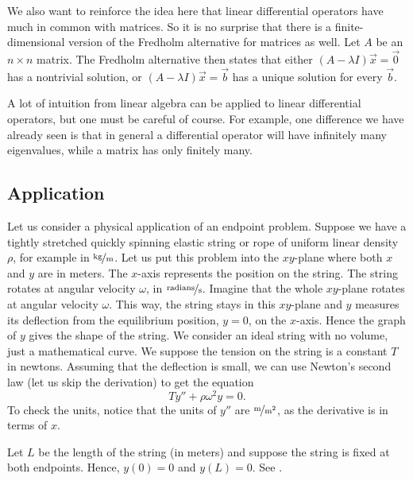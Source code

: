 We also want to reinforce the idea here that linear differential operators have
much in common with matrices.  So it is no surprise that
there is a finite-dimensional version of the Fredholm alternative for matrices as
well.  Let $A$ be an $n \times n$ matrix.  The Fredholm alternative then
states that either $(A-\lambda I) \vec{x}
= \vec{0}$ has a nontrivial solution, or $(A-\lambda I) \vec{x} = \vec{b}$
has a unique solution for every $\vec{b}$.

A lot of intuition from linear algebra can be applied to linear differential
operators, but one must be careful of course.  For example, one 
difference we have already seen is that in general a differential operator
will have infinitely many eigenvalues, while a matrix has only finitely many.

\subsection{Application}

Let us consider a physical application of an endpoint problem.
Suppose we have a tightly stretched quickly spinning elastic
string or rope of uniform linear density $\rho$, for example in
$\unitfrac{kg}{m}$.
Let us put this problem into the $xy$-plane where both $x$ and $y$
are in meters.  The $x$-axis represents the
position on the string.  The string rotates at angular velocity $\omega$,
in $\unitfrac{radians}{s}$.
Imagine that the whole $xy$-plane rotates at angular velocity $\omega$.
This way, the string stays in this $xy$-plane and $y$ 
measures its deflection from the equilibrium position, $y=0$, on the $x$-axis.
Hence the graph of $y$ gives the shape of the string.
We consider an ideal string with
no volume, just a mathematical curve.
We suppose the tension on the string is a constant $T$ in newtons.
Assuming that the deflection is small,
we can use Newton's second law (let us skip the derivation) to get the equation
\begin{equation*}
T y'' + \rho \omega^2 y = 0 .
\end{equation*}
To check the units, notice that the units of $y''$ are $\unitfrac{m}{m^2}$, as the derivative is
in terms of $x$.

Let $L$ be the length of the string (in meters) and suppose the string
is fixed at both endpoints.
Hence, $y(0) = 0$ and $y(L) = 0$.  See
.

